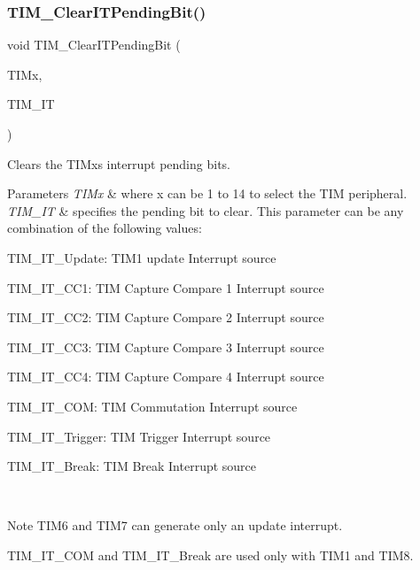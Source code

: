 \mbox{\label{group___t_i_m___group5_ga9eb1e95af71ed380f51a2c6d585cc5d6}} 
\subsubsection{\texorpdfstring{T\+I\+M\+\_\+\+Clear\+I\+T\+Pending\+Bit()}{TIM\_ClearITPendingBit()}}
{\footnotesize\ttfamily void T\+I\+M\+\_\+\+Clear\+I\+T\+Pending\+Bit (\begin{DoxyParamCaption}\item[{\hyperlink{struct_t_i_m___type_def}{T\+I\+M\+\_\+\+Type\+Def} $\ast$}]{T\+I\+Mx,  }\item[{uint16\+\_\+t}]{T\+I\+M\+\_\+\+IT }\end{DoxyParamCaption})}



Clears the T\+I\+Mx\textquotesingle{}s interrupt pending bits. 


\begin{DoxyParams}{Parameters}
{\em T\+I\+Mx} & where x can be 1 to 14 to select the T\+IM peripheral. \\
\hline
{\em T\+I\+M\+\_\+\+IT} & specifies the pending bit to clear. This parameter can be any combination of the following values\+: \begin{DoxyItemize}
\item T\+I\+M\+\_\+\+I\+T\+\_\+\+Update\+: T\+I\+M1 update Interrupt source \item T\+I\+M\+\_\+\+I\+T\+\_\+\+C\+C1\+: T\+IM Capture Compare 1 Interrupt source \item T\+I\+M\+\_\+\+I\+T\+\_\+\+C\+C2\+: T\+IM Capture Compare 2 Interrupt source \item T\+I\+M\+\_\+\+I\+T\+\_\+\+C\+C3\+: T\+IM Capture Compare 3 Interrupt source \item T\+I\+M\+\_\+\+I\+T\+\_\+\+C\+C4\+: T\+IM Capture Compare 4 Interrupt source \item T\+I\+M\+\_\+\+I\+T\+\_\+\+C\+OM\+: T\+IM Commutation Interrupt source \item T\+I\+M\+\_\+\+I\+T\+\_\+\+Trigger\+: T\+IM Trigger Interrupt source \item T\+I\+M\+\_\+\+I\+T\+\_\+\+Break\+: T\+IM Break Interrupt source\end{DoxyItemize}
\\
\hline
\end{DoxyParams}
\begin{DoxyNote}{Note}
T\+I\+M6 and T\+I\+M7 can generate only an update interrupt. 

T\+I\+M\+\_\+\+I\+T\+\_\+\+C\+OM and T\+I\+M\+\_\+\+I\+T\+\_\+\+Break are used only with T\+I\+M1 and T\+I\+M8.
\end{DoxyNote}

